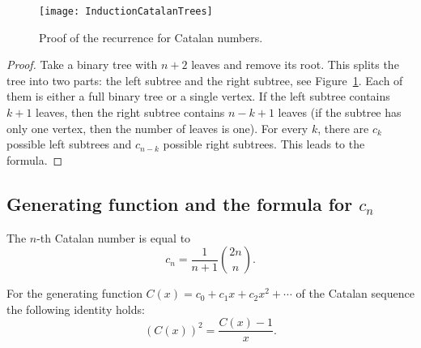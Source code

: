 \begin{page}


\begin{figure}[ht]
\begin{center}
\texttt{[image: InductionCatalanTrees]}
\end{center}
\caption{Proof of the recurrence for Catalan numbers.}
\label{fig:InductionCatalanTrees}
\end{figure}

\begin{proof}
Take a binary tree with $n+2$ leaves and remove its root.
This splits the tree into two parts: the left subtree and the right subtree, see Figure~\ref{fig:InductionCatalanTrees}.
Each of them is either a full binary tree or a single vertex.
If the left subtree contains $k+1$ leaves, then the right subtree contains $n-k+1$ leaves
(if the subtree has only one vertex, then the number of leaves is one).
For every $k$, there are $c_k$ possible left subtrees and $c_{n-k}$ possible right subtrees.
This leads to the formula.
\end{proof}



\end{page}

\begin{page}

\subsection{Generating function and the formula for $c_n$}
\label{sec:GenFuncCatalan}

\end{page}

\begin{page}

\begin{thm}
\label{thm:CatalanFormula}
The $n$-th Catalan number is equal to
\begin{equation}
\label{eqn:CatalanFormula}
c_n = \frac1{n+1} \binom{2n}{n}.
\end{equation}
\end{thm}

\end{page}

\begin{page}

\begin{lem}
\label{lem:CatalanGenFunc}
For the generating function $C(x) = c_0 + c_1 x + c_2 x^2 + \cdots$ of the Catalan sequence
the following identity holds:
\[
(C(x))^2 = \frac{C(x) - 1}{x}.
\]
\end{lem}

\end{page}

